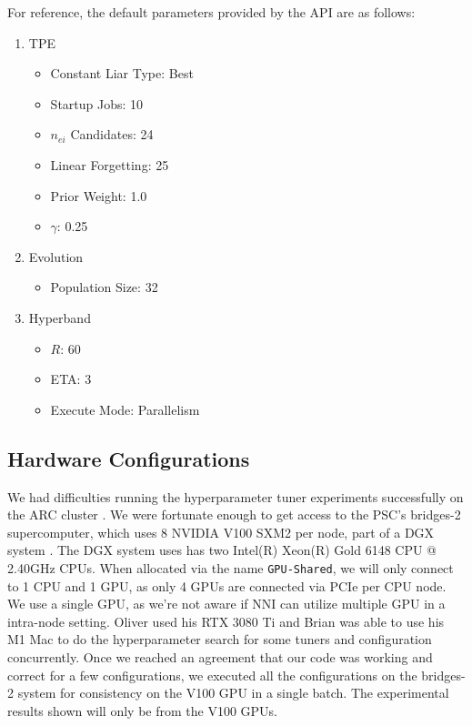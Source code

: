 \documentclass{article}
\begin{document}
For reference, the default parameters provided by the API are as follows:
\begin{enumerate}
    \item TPE
        \begin{itemize}
            \item Constant Liar Type: Best
            \item Startup Jobs: 10
            \item $n_{ei}$ Candidates: 24
            \item Linear Forgetting: 25
            \item Prior Weight: 1.0
            \item $\gamma$: 0.25
        \end{itemize}
    \item Evolution
        \begin{itemize}
            \item Population Size: 32
        \end{itemize}
    \item Hyperband
        \begin{itemize}
            \item $R$: 60
            \item ETA: 3
            \item Execute Mode: Parallelism
        \end{itemize}
\end{enumerate}

\subsection{Hardware Configurations}
We had difficulties running the hyperparameter tuner experiments successfully on the ARC cluster \cite{arc}. We were fortunate enough to get access to the PSC's bridges-2 supercomputer, which uses 8 NVIDIA V100 SXM2 per node, part of a DGX system \cite{v100, bridges-2}. The DGX system uses has two Intel(R) Xeon(R) Gold 6148 CPU @ 2.40GHz CPUs. When allocated via the name \verb|GPU-Shared|, we will only connect to 1 CPU and 1 GPU, as only 4 GPUs are connected via PCIe per CPU node. We use a single GPU, as we're not aware if NNI can utilize multiple GPU in a intra-node setting. Oliver used his RTX 3080 Ti and Brian was able to use his M1 Mac to do the hyperparameter search for some tuners and configuration concurrently. Once we reached an agreement that our code was working and correct for a few configurations, we executed all the configurations on the bridges-2 system for consistency on the V100 GPU in a single batch. The experimental results shown will only be from the V100 GPUs.
\end{document}
